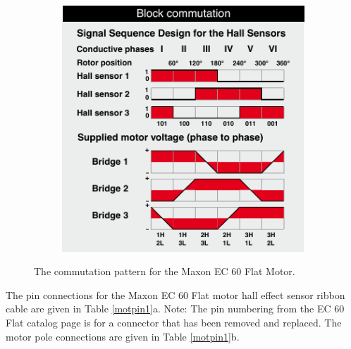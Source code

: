\documentclass{article}
\begin{document}
\begin{figure}[h!]
\begin{subfigure}{0.4\textwidth}
		\includegraphics[width=\textwidth]{commutation2}
		\caption{}
	\end{subfigure}
	\caption{The commutation pattern for the Maxon EC 60 Flat Motor.\protect\footnotemark}
	\label{fig:commutation}
\end{figure}

The pin connections for the Maxon EC 60 Flat motor hall effect sensor ribbon cable  are given in Table \ref{motpin1}a. Note: The pin numbering from the EC 60 Flat catalog page is for a connector that has been removed and replaced. The motor pole connections are given in Table \ref{motpin1}b.
\end{document}
